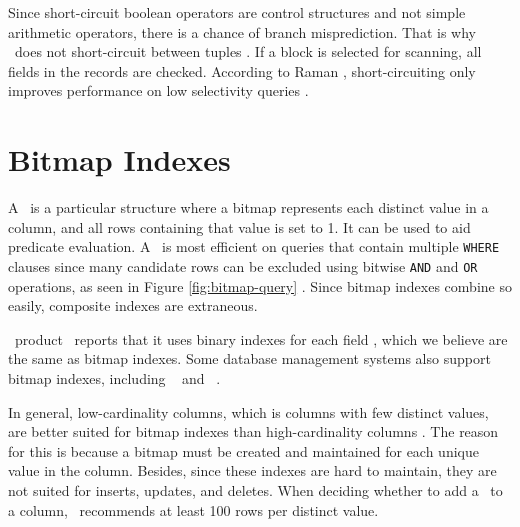 Since short-circuit boolean operators are control structures and not simple arithmetic operators, there is a chance of branch misprediction. That is why \blink~does not short-circuit between tuples \cite{Raman2008-gi, Johnson2008-cp}. If a block is selected for scanning, all fields in the records are checked. According to Raman \ea, short-circuiting only improves performance on low selectivity queries \cite{Raman2008-gi}.


\section{Bitmap Indexes}
\label{sec:Bitmap Indexes}


A \biti~is a particular structure where a bitmap represents each distinct value in a column, and all rows containing that value is set to 1. It can be used to aid predicate evaluation. A \biti~is most efficient on queries that contain multiple \texttt{WHERE} clauses since many candidate rows can be excluded using bitwise \texttt{AND} and \texttt{OR} operations, as seen in Figure \ref{fig:bitmap-query} \cite{noauthor_undated-hp}. Since bitmap indexes combine so easily, composite indexes are extraneous. 

\bd~product \qlikview~reports that it uses binary indexes for each field \cite{Qlik2011-ef}, which we believe are the same as bitmap indexes. Some database management systems also support bitmap indexes, including \oracle~\cite{noauthor_undated-hp} and \ibm~\cite{Raman2013-em}.

In general, low-cardinality columns, which is columns with few distinct values, are better suited for bitmap indexes than high-cardinality columns \cite{noauthor_undated-hp}. The reason for this is because a bitmap must be created and maintained for each unique value in the column. Besides, since these indexes are hard to maintain, they are not suited for inserts, updates, and deletes. When deciding whether to add a \biti~to a column, \oracle~recommends at least 100 rows per distinct value. 

